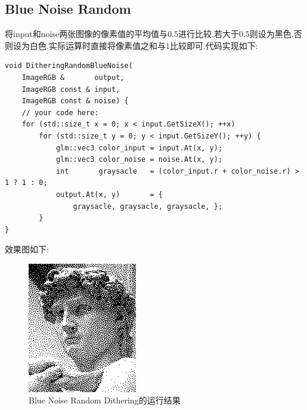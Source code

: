 \documentclass{ctexart}
\begin{document}
\subsection*{Blue Noise Random}
将{\codefont input}和{\codefont noise}两张图像的像素值的平均值与$0.5$进行比较,若大于$0.5$则设为黑色,否则设为白色.实际运算时直接将像素值之和与$1$比较即可.代码实现如下:
\begin{lstlisting}
void DitheringRandomBlueNoise(
    ImageRGB &       output,
    ImageRGB const & input,
    ImageRGB const & noise) {
    // your code here:
    for (std::size_t x = 0; x < input.GetSizeX(); ++x)
        for (std::size_t y = 0; y < input.GetSizeY(); ++y) {
            glm::vec3 color_input = input.At(x, y);
            glm::vec3 color_noise = noise.At(x, y);
            int       graysacle   = (color_input.r + color_noise.r) > 1 ? 1 : 0;
            output.At(x, y)       = {
                graysacle, graysacle, graysacle, };
        }
}
\end{lstlisting}
效果图如下:
\begin{figure}[H]
    \centering\includegraphics[scale=0.75]{figure/BlueNoise.png}
    \caption{Blue Noise Random Dithering的运行结果}
\end{figure}
\end{document}
